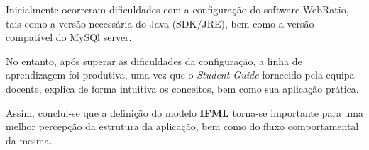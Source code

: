 \documentclass[11pt,a4paper]{report}%
\begin{document}
\hspace{5mm} Inicialmente ocorreram dificuldades com a configuração do software WebRatio, tais como a versão necessária do Java (SDK/JRE), bem como a versão compatível do MySQl server.

\hspace{5mm} No entanto, após superar as dificuldades da configuração, a linha de aprendizagem foi produtiva, uma vez que o \textit{Student Guide} fornecido pela equipa docente, explica de forma intuitiva os conceitos, bem como sua aplicação prática.

\hspace{5mm} Assim, conclui-se que a definição do modelo \textbf{IFML} torna-se importante para uma melhor percepção da estrutura da aplicação, bem como do fluxo comportamental da mesma.
\end{document}
